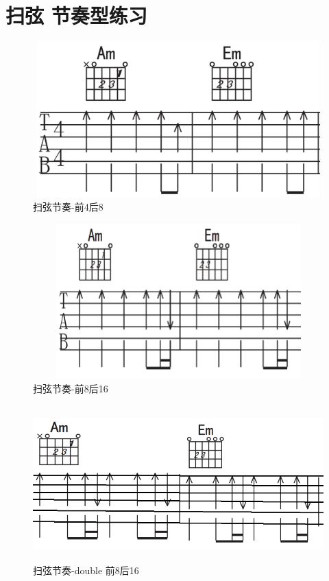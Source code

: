 \documentclass[UTF8,a4paper,12pt]{ctexbook}
\begin{document}
	
	\section{扫弦 节奏型练习}
		\begin{figure}[H]
			\centering
			\includegraphics[width=15cm,height=6cm]{sao_01}
			\caption{扫弦节奏-前4后8}
		\end{figure}
	
	
		\begin{figure}[H]
			\centering
			\includegraphics[width=15cm,height=6cm]{sao_02}
			\caption{扫弦节奏-前8后16}
		\end{figure}		

		\begin{figure}[H]
			\centering
			\includegraphics[width=15cm,height=6cm]{sao_03}
			\caption{扫弦节奏-double 前8后16}
		\end{figure}	
	
\end{document}
